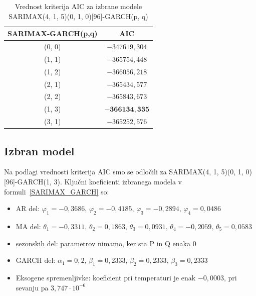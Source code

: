 \documentclass[a4paper, 11pt]{article}
\begin{document}
\begin{table}[!ht]
    \centering
    \caption{Vrednost kriterija AIC za izbrane modele SARIMAX(4, 1, 5)(0, 1, 0)[96]-GARCH(p, q)}\par\medskip
    \label{Tab:GARCH_AIC}
    \begin{tabular}{c|c}
        SARIMAX-GARCH(p,q) & AIC \\ \hline
        (0, 0) & $-347619{,}304$ \\ 
        (1, 1) & $-365754{,}448$ \\ 
        (1, 2) & $-366056{,}218$ \\ 
        (2, 1) & $-365434{,}577$ \\ 
        (2, 2) & $-365843{,}673$ \\ 
        (1, 3) & $\mathbf{-366134{,}335}$ \\ 
        (3, 1) & $-365252{,}576$ \\ 
    \end{tabular}
\end{table}



\subsection{Izbran model}

Na podlagi vrednosti kriterija AIC smo se odločili za SARIMAX(4, 1, 5)(0, 1, 0)[96]-GARCH(1, 3). 
Ključni koeficienti izbranega modela v formuli~\eqref{SARIMAX_GARCH} so:

\begin{itemize}
    \item  AR del: $\varphi_1 = -0{,}3686,\, \varphi_2 = -0{,}4185,\, \varphi_3 = -0{,2894},\, \varphi_4 = 0{,0486}$
    \item  MA del: $\theta_1 = - 0{,}3311,\, \theta_2 = 0{,}1863,\, \theta_3 = 0{,}0931,\, \theta_4 = -0{,}2059,\, \theta_5 = 0{,}0583$
    \item  sezonskih del: parametrov nimamo, ker sta P in Q enaka $0$
    \item  GARCH del: $\alpha_1 = 0{,}2,\, \beta_1 = 0{,}2333,\, \beta_2 = 0{,}2333,\, \beta_3 = 0{,}2333$
    \item  Eksogene spremenljivke: koeficient pri temperaturi je enak $-0{,}0003$, pri sevanju pa $3{,}747 \cdot 10^{-6}$
\end{itemize}
\end{document}
